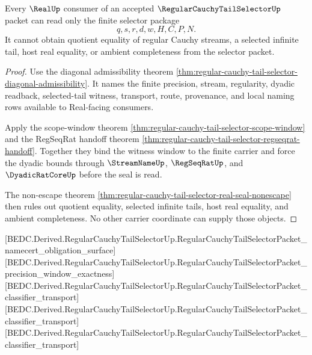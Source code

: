 \begin{theorem}
\label{thm:regular-cauchy-tail-selector-real-consumer-boundary}
Every $\RealUp$ consumer of an accepted $\RegularCauchyTailSelectorUp$ packet
can read only the finite selector package
$$
q,s,r,d,w,H,C,P,N.
$$
It cannot obtain quotient equality of regular Cauchy streams, a selected
infinite tail, host real equality, or ambient completeness from the selector
packet.
\end{theorem}
\begin{proof}
Use the diagonal admissibility theorem
\autoref{thm:regular-cauchy-tail-selector-diagonal-admissibility}. It names the
finite precision, stream, regularity, dyadic readback, selected-tail witness,
transport, route, provenance, and local naming rows available to Real-facing
consumers.

Apply the scope-window theorem
\autoref{thm:regular-cauchy-tail-selector-scope-window} and the RegSeqRat
handoff theorem
\autoref{thm:regular-cauchy-tail-selector-regseqrat-handoff}. Together they
bind the witness window to the finite carrier and force the dyadic bounds
through $\StreamNameUp$, $\RegSeqRatUp$, and $\DyadicRatCoreUp$ before the seal
is read.

The non-escape theorem
\autoref{thm:regular-cauchy-tail-selector-real-seal-nonescape} then rules out
quotient equality, selected infinite tails, host real equality, and ambient
completeness. No other carrier coordinate can supply those objects.
\end{proof}

[BEDC.Derived.RegularCauchyTailSelectorUp.RegularCauchyTailSelectorPacket\_namecert\_obligation\_surface]
[BEDC.Derived.RegularCauchyTailSelectorUp.RegularCauchyTailSelectorPacket\_precision\_window\_exactness]
[BEDC.Derived.RegularCauchyTailSelectorUp.RegularCauchyTailSelectorPacket\_classifier\_transport]
[BEDC.Derived.RegularCauchyTailSelectorUp.RegularCauchyTailSelectorPacket\_classifier\_transport]
[BEDC.Derived.RegularCauchyTailSelectorUp.RegularCauchyTailSelectorPacket\_classifier\_transport]

